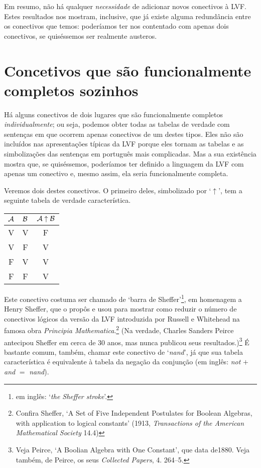 Em resumo, não há qualquer \emph{necessidade} de adicionar novos conectivos à LVF.
Estes resultados nos mostram, inclusive, que já existe alguma redundância entre os conectivos que temos: poderíamos ter nos contentado com apenas dois conectivos, se quiséssemos ser realmente austeros.


\section{Concetivos que são funcionalmente completos sozinhos}

Há alguns conectivos de dois lugares que são funcionalmente completos \emph{individualmente}; ou seja, podemos obter todas as tabelas de verdade com sentenças em que ocorrem apenas conectivos de um destes tipos.
Eles não são incluídos nas apresentações típicas da LVF porque eles tornam as tabelas e as simbolizações das sentenças em português mais complicadas.
Mas a sua existência mostra que, se quiséssemos, poderíamos ter definido a linguagem da LVF com apenas um conectivo e, mesmo assim, ela seria funcionalmente completa.

Veremos dois destes conectivos.
O primeiro deles, simbolizado por `$\uparrow$', tem a seguinte tabela de verdade característica. 
\begin{center}
\begin{tabular}{c c | c}
$\mathcal{A}$ & $\mathcal{B}$ & $\mathcal{A} \mathrel{\uparrow} \mathcal{B}$\\
\hline
 V & V & F \\
 V & F & V \\
 F & V & V  \\
 F & F & V
\end{tabular}
\end{center}

 Este conectivo costuma ser chamado de `barra de Sheffer'\footnote{ em inglês: `\emph{the Sheffer stroke}'.}, em homenagem a Henry Sheffer, que o propôs e usou para mostrar como reduzir o número de conectivos lógicos da versão da LVF introduzida por Russell e Whitehead na famosa obra  \emph{Principia Mathematica}.\footnote{
 Confira Sheffer, `A Set of Five Independent Postulates for Boolean Algebras, with application to logical constants' (1913, \emph{Transactions of the American Mathematical Society} 14.4)}
 (Na verdade, Charles Sanders Peirce antecipou Sheffer em cerca de 30 anos, mas nunca publicou seus resultados.)\footnote{
 Veja Peirce, `A Boolian Algebra with One Constant', que data de1880. Veja também, de Peirce, os seus  \emph{Collected Papers}, 4. 264--5.}
 É bastante comum, também, chamar este conectivo de `\emph{nand}', já que sua tabela característica é equivalente à tabela da negação da conjunção (em inglês: \emph{not} $+$ \emph{and} $=$ \emph{nand}).



